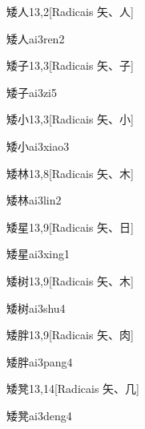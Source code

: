 \begin{entry}{矮人}{13,2}[Radicais ⽮、⼈]
  \begin{phonetics}{矮人}{ai3ren2}
  \end{phonetics}
\end{entry}

\begin{entry}{矮子}{13,3}[Radicais ⽮、⼦]
  \begin{phonetics}{矮子}{ai3zi5}
  \end{phonetics}
\end{entry}

\begin{entry}{矮小}{13,3}[Radicais ⽮、⼩]
  \begin{phonetics}{矮小}{ai3xiao3}
  \end{phonetics}
\end{entry}

\begin{entry}{矮林}{13,8}[Radicais ⽮、⽊]
  \begin{phonetics}{矮林}{ai3lin2}
  \end{phonetics}
\end{entry}

\begin{entry}{矮星}{13,9}[Radicais ⽮、⽇]
  \begin{phonetics}{矮星}{ai3xing1}
  \end{phonetics}
\end{entry}

\begin{entry}{矮树}{13,9}[Radicais ⽮、⽊]
  \begin{phonetics}{矮树}{ai3shu4}
  \end{phonetics}
\end{entry}

\begin{entry}{矮胖}{13,9}[Radicais ⽮、⾁]
  \begin{phonetics}{矮胖}{ai3pang4}
  \end{phonetics}
\end{entry}

\begin{entry}{矮凳}{13,14}[Radicais ⽮、⼏]
  \begin{phonetics}{矮凳}{ai3deng4}
  \end{phonetics}
\end{entry}

